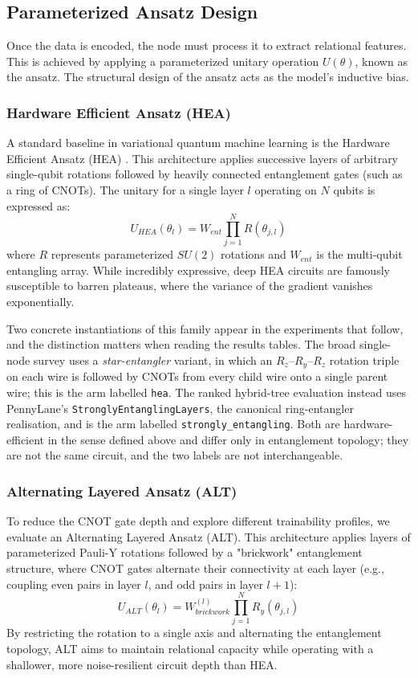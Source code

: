 \documentclass[12pt, a4paper, oneside]{report}
\begin{document}
\subsection{Parameterized Ansatz Design}
\label{sec:ansatz_design}
Once the data is encoded, the node must process it to extract relational features. This is achieved by applying a parameterized unitary operation $U(\theta)$, known as the ansatz. The structural design of the ansatz acts as the model's inductive bias.
\subsubsection{Hardware Efficient Ansatz (HEA)}
A standard baseline in variational quantum machine learning is the Hardware Efficient Ansatz (HEA) \cite{kandala2017}. This architecture applies successive layers of arbitrary single-qubit rotations followed by heavily connected entanglement gates (such as a ring of CNOTs). The unitary for a single layer $l$ operating on $N$ qubits is expressed as:
\begin{equation}
    U_{HEA}(\theta_l) = W_{ent} \prod_{j=1}^N R(\theta_{j,l})
\end{equation}
where $R$ represents parameterized $SU(2)$ rotations and $W_{ent}$ is the multi-qubit entangling array. While incredibly expressive, deep HEA circuits are famously susceptible to barren plateaus, where the variance of the gradient vanishes exponentially.

Two concrete instantiations of this family appear in the experiments that follow, and the distinction matters when reading the results tables. The broad single-node survey uses a \textit{star-entangler} variant, in which an $R_z$--$R_y$--$R_z$ rotation triple on each wire is followed by CNOTs from every child wire onto a single parent wire; this is the arm labelled \texttt{hea}. The ranked hybrid-tree evaluation instead uses PennyLane's \texttt{StronglyEntanglingLayers}, the canonical ring-entangler realisation, and is the arm labelled \texttt{strongly\_entangling}. Both are hardware-efficient in the sense defined above and differ only in entanglement topology; they are not the same circuit, and the two labels are not interchangeable.
\subsubsection{Alternating Layered Ansatz (ALT)}
To reduce the CNOT gate depth and explore different trainability profiles, we evaluate an Alternating Layered Ansatz (ALT). This architecture applies layers of parameterized Pauli-Y rotations followed by a "brickwork" entanglement structure, where CNOT gates alternate their connectivity at each layer (e.g., coupling even pairs in layer $l$, and odd pairs in layer $l+1$):
\begin{equation}
    U_{ALT}(\theta_l) = W_{brickwork}^{(l)} \prod_{j=1}^N R_y(\theta_{j,l})
\end{equation}
By restricting the rotation to a single axis and alternating the entanglement topology, ALT aims to maintain relational capacity while operating with a shallower, more noise-resilient circuit depth than HEA.
\end{document}

